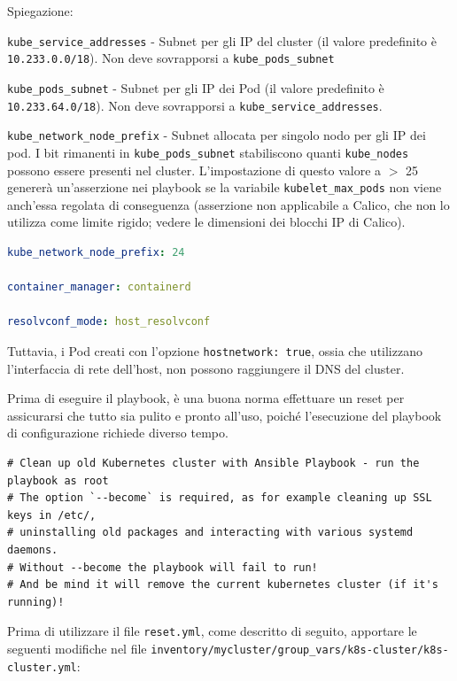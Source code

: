 \documentclass[11pt, a4paper]{article}
\begin{document}
Spiegazione:

\texttt{kube\_service\_addresses} - Subnet per gli IP del cluster (il valore predefinito è \texttt{10.233.0.0/18}). Non deve sovrapporsi a \texttt{kube\_pods\_subnet}


\texttt{kube\_pods\_subnet} - Subnet per gli IP dei Pod (il valore predefinito è \texttt{10.233.64.0/18}). Non deve sovrapporsi a \texttt{kube\_service\_addresses}.

\texttt{kube\_network\_node\_prefix} - Subnet allocata per singolo nodo per gli IP dei pod. I bit rimanenti in \texttt{kube\_pods\_subnet} stabiliscono quanti \texttt{kube\_nodes} possono essere presenti nel cluster. L'impostazione di questo valore a $>$ 25 genererà un'asserzione nei playbook se la variabile \texttt{kubelet\_max\_pods} non viene anch'essa regolata di conseguenza (asserzione non applicabile a Calico, che non lo utilizza come limite rigido; vedere le dimensioni dei blocchi IP di Calico).

\begin{lstlisting}[language=yaml]
kube_network_node_prefix: 24

container_manager: containerd

resolvconf_mode: host_resolvconf
\end{lstlisting}

Tuttavia, i Pod creati con l'opzione \texttt{hostnetwork: true}, ossia che utilizzano l'interfaccia di rete dell'host, non possono raggiungere il DNS del cluster.

Prima di eseguire il playbook, è una buona norma effettuare un reset per assicurarsi che tutto sia pulito e pronto all'uso, poiché l'esecuzione del playbook di configurazione richiede diverso tempo.

\begin{lstlisting}
# Clean up old Kubernetes cluster with Ansible Playbook - run the playbook as root
# The option `--become` is required, as for example cleaning up SSL keys in /etc/,
# uninstalling old packages and interacting with various systemd daemons.
# Without --become the playbook will fail to run!
# And be mind it will remove the current kubernetes cluster (if it's running)!
\end{lstlisting}

Prima di utilizzare il file \texttt{reset.yml}, come descritto di seguito, apportare le seguenti modifiche nel file \texttt{inventory/mycluster/group\_vars/k8s-cluster/k8s-cluster.yml}:
\end{document}

